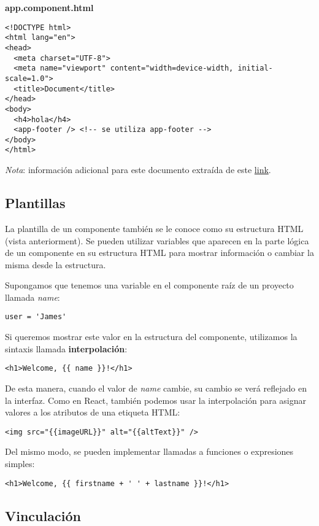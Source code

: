 \textbf{app.component.html}
\begin{lstlisting}[style=htmlcssjs]
<!DOCTYPE html>
<html lang="en">
<head>
  <meta charset="UTF-8">
  <meta name="viewport" content="width=device-width, initial-scale=1.0">
  <title>Document</title>
</head>
<body>
  <h4>hola</h4>
  <app-footer /> <!-- se utiliza app-footer -->
</body>
</html>
\end{lstlisting}

\textit{Nota}: información adicional para este documento extraída de este \href{https://youtu.be/g8geh3lFpBg?si=hH4lsMKYcjtP0dFD}{link}.


\subsection{Plantillas}

La plantilla de un componente también se le conoce como su estructura HTML (vista anteriorment). Se pueden utilizar variables que aparecen en la parte lógica de un componente en su estructura HTML para mostrar información o cambiar la misma desde la estructura.

Supongamos que tenemos una variable en el componente raíz de un proyecto llamada \textit{name}:
\begin{lstlisting}[style=htmlcssjs]
user = 'James'
\end{lstlisting}

Si queremos mostrar este valor en la estructura del componente, utilizamos la sintaxis llamada \textbf{interpolación}:
\begin{lstlisting}[style=htmlcssjs]
<h1>Welcome, {{ name }}!</h1>
\end{lstlisting}

De esta manera, cuando el valor de \textit{name} cambie, su cambio se verá reflejado en la interfaz. Como en React, también podemos usar la interpolación para asignar valores a los atributos de una etiqueta HTML:
\begin{lstlisting}[style=htmlcssjs]
<img src="{{imageURL}}" alt="{{altText}}" />
\end{lstlisting}

Del mismo modo, se pueden implementar llamadas a funciones o expresiones simples:
\begin{lstlisting}[style=htmlcssjs]
<h1>Welcome, {{ firstname + ' ' + lastname }}!</h1>
\end{lstlisting}


\subsection{Vinculación}

